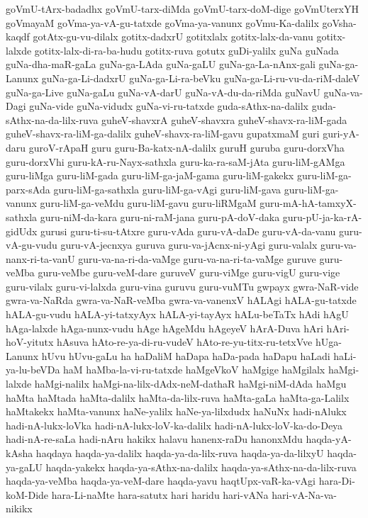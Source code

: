 {goVmU-tArx-badadhx
goVmU-tarx-diMda
goVmU-tarx-doM-dige
goVmUterxYH
goVmayaM
goVma-ya-vA-gu-tatxde
goVma-ya-vanunx
goVmu-Ka-dalilx
goVsha-kaqdf
gotAtx-gu-vu-dilalx
gotitx-dadxrU
gotitxlalx
gotitx-lalx-da-vanu
gotitx-lalxde
gotitx-lalx-di-ra-ba-hudu
gotitx-ruva
gotutx
guDi-yalilx
guNa
guNada
guNa-dha-maR-gaLa
guNa-ga-LAda
guNa-gaLU
guNa-ga-La-nAnx-gali
guNa-ga-Lanunx
guNa-ga-Li-dadxrU
guNa-ga-Li-ra-beVku
guNa-ga-Li-ru-vu-da-riM-daleV
guNa-ga-Live
guNa-gaLu
guNa-vA-darU
guNa-vA-du-da-riMda
guNavU
guNa-va-Dagi
guNa-vide
guNa-vidudx
guNa-vi-ru-tatxde
guda-sAthx-na-dalilx
guda-sAthx-na-da-lilx-ruva
guheV-shavxrA
guheV-shavxra
guheV-shavx-ra-liM-gada
guheV-shavx-ra-liM-ga-dalilx
guheV-shavx-ra-liM-gavu
gupatxmaM
guri
guri-yA-daru
guroV-rApaH
guru
guru-Ba-katx-nA-dalilx
guruH
guruba
guru-dorxVha
guru-dorxVhi
guru-kA-ru-Nayx-sathxla
guru-ka-ra-saM-jAta
guru-liM-gAMga
guru-liMga
guru-liM-gada
guru-liM-ga-jaM-gama
guru-liM-gakekx
guru-liM-ga-parx-sAda
guru-liM-ga-sathxla
guru-liM-ga-vAgi
guru-liM-gava
guru-liM-ga-vanunx
guru-liM-ga-veMdu
guru-liM-gavu
guru-liRMgaM
guru-mA-hA-tamxyX-sathxla
guru-niM-da-kara
guru-ni-raM-jana
guru-pA-doV-daka
guru-pU-ja-ka-rA-gidUdx
gurusi
guru-ti-su-tAtxre
guru-vAda
guru-vA-daDe
guru-vA-da-vanu
guru-vA-gu-vudu
guru-vA-jecnxya
guruva
guru-va-jAcnx-ni-yAgi
guru-valalx
guru-va-nanx-ri-ta-vanU
guru-va-na-ri-da-vaMge
guru-va-na-ri-ta-vaMge
guruve
guru-veMba
guru-veMbe
guru-veM-dare
guruveV
guru-viMge
guru-vigU
guru-vige
guru-vilalx
guru-vi-lalxda
guru-vina
guruvu
guru-vuMTu
gwpayx
gwra-NaR-vide
gwra-va-NaRda
gwra-va-NaR-veMba
gwra-va-vanenxV
hALAgi
hALA-gu-tatxde
hALA-gu-vudu
hALA-yi-tatxyAyx
hALA-yi-tayAyx
hALu-beTaTx
hAdi
hAgU
hAga-lalxde
hAga-nunx-vudu
hAge
hAgeMdu
hAgeyeV
hArA-Duva
hAri
hAri-hoV-yitutx
hAsuva
hAto-re-ya-di-ru-vudeV
hAto-re-yu-titx-ru-tetxVve
hUga-Lanunx
hUvu
hUvu-gaLu
ha
haDaliM
haDapa
haDa-pada
haDapu
haLadi
haLi-ya-lu-beVDa
haM
haMba-la-vi-ru-tatxde
haMgeVkoV
haMgige
haMgilalx
haMgi-lalxde
haMgi-nalilx
haMgi-na-lilx-dAdx-neM-dathaR
haMgi-niM-dAda
haMgu
haMta
haMtada
haMta-dalilx
haMta-da-lilx-ruva
haMta-gaLa
haMta-ga-Lalilx
haMtakekx
haMta-vanunx
haNe-yalilx
haNe-ya-lilxdudx
haNuNx
hadi-nAlukx
hadi-nA-lukx-loVka
hadi-nA-lukx-loV-ka-dalilx
hadi-nA-lukx-loV-ka-do-Deya
hadi-nA-re-saLa
hadi-nAru
hakikx
halavu
hanenx-raDu
hanonxMdu
haqda-yA-kAsha
haqdaya
haqda-ya-dalilx
haqda-ya-da-lilx-ruva
haqda-ya-da-lilxyU
haqda-ya-gaLU
haqda-yakekx
haqda-ya-sAthx-na-dalilx
haqda-ya-sAthx-na-da-lilx-ruva
haqda-ya-veMba
haqda-ya-veM-dare
haqda-yavu
haqtUpx-vaR-ka-vAgi
hara-Di-koM-Dide
hara-Li-naMte
hara-satutx
hari
haridu
hari-vANa
hari-vA-Na-va-nikikx
}

